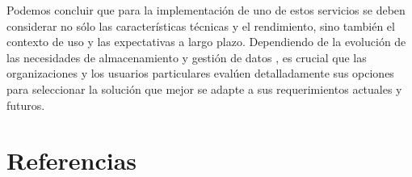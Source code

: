 \documentclass[a4paper,10pt]{article}
\begin{document}
	Podemos concluir que para la implementación de uno de estos servicios se deben considerar no sólo las características técnicas y el rendimiento, sino también el contexto de uso y las expectativas a largo plazo. Dependiendo de la evolución de las necesidades de almacenamiento y gestión de datos , es crucial que las organizaciones y los usuarios particulares evalúen detalladamente sus opciones para seleccionar la solución que mejor se adapte a sus requerimientos actuales y futuros.
	
	\nocite{*}	
	\section{Referencias}
	\printbibliography[heading=none]
\end{document}
